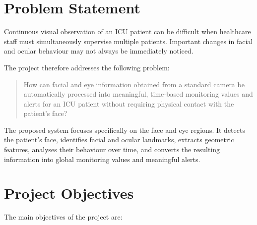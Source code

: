 \documentclass[12pt]{tietreport}
\begin{document}
\section{Problem Statement}

Continuous visual observation of an ICU patient can be difficult when
healthcare staff must simultaneously supervise multiple patients.
Important changes in facial and ocular behaviour may not always be
immediately noticed.

The project therefore addresses the following problem:

\begin{quote}
How can facial and eye information obtained from a standard camera
be automatically processed into meaningful, time-based monitoring
values and alerts for an ICU patient without requiring physical
contact with the patient's face?
\end{quote}

The proposed system focuses specifically on the face and eye regions.
It detects the patient's face, identifies facial and ocular landmarks,
extracts geometric features, analyses their behaviour over time, and
converts the resulting information into global monitoring values and
meaningful alerts.

\section{Project Objectives}

The main objectives of the project are:
\end{document}
